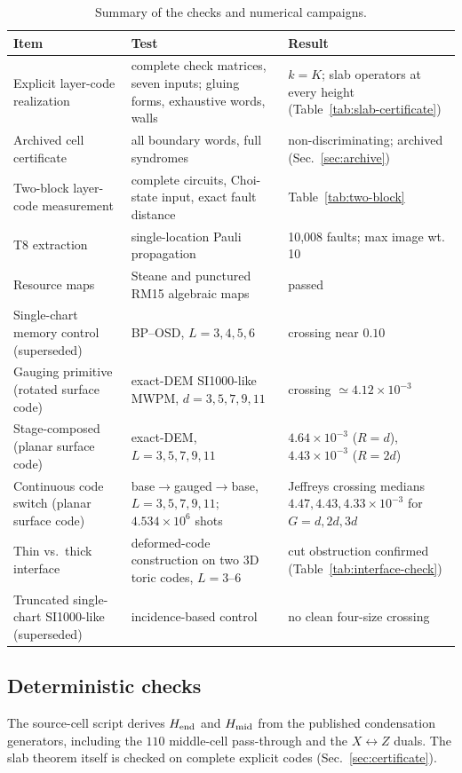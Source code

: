 \documentclass[aps,prx,reprint,superscriptaddress,nofootinbib,floatfix,longbibliography]{revtex4-2}
\theoremstyle{definition}
\begin{document}
\begin{table}[t]
\caption{Summary of the checks and numerical campaigns.}
\label{tab:supp-final-campaign}
\begin{tabular}{p{}p{}p{}}
\toprule
Item & Test & Result\\ \midrule
Explicit layer-code realization & complete check matrices, seven inputs; gluing forms, exhaustive words, walls & $k=K$; slab operators at every height (Table~\ref{tab:slab-certificate})\\
Archived cell certificate & all boundary words, full syndromes & non-discriminating; archived (Sec.~\ref{sec:archive})\\
Two-block layer-code measurement & complete circuits, Choi-state input, exact fault distance & Table~\ref{tab:two-block}\\
T8 extraction & single-location Pauli propagation & 10,008 faults; max image wt. 10\\
Resource maps & Steane and punctured RM15 algebraic maps & passed\\
Single-chart memory control (superseded) & BP--OSD, $L=3,4,5,6$ & crossing near $0.10$\\
Gauging primitive (rotated surface code) & exact-DEM SI1000-like MWPM, $d=3,5,7,9,11$ & crossing $\simeq4.12\times10^{-3}$\\
Stage-composed (planar surface code) & exact-DEM, $L=3,5,7,9,11$ & $4.64\times10^{-3}$ ($R=d$), $4.43\times10^{-3}$ ($R=2d$)\\
Continuous code switch (planar surface code) & base$\to$gauged$\to$base, $L=3,5,7,9,11$; $4.534\times10^6$ shots & Jeffreys crossing medians $4.47,4.43,4.33\times10^{-3}$ for $G=d,2d,3d$\\
Thin vs.\ thick interface & deformed-code construction on two 3D toric codes, $L=3$--$6$ & cut obstruction confirmed (Table~\ref{tab:interface-check})\\
Truncated single-chart SI1000-like (superseded) & incidence-based control & no clean four-size crossing\\
\bottomrule
\end{tabular}
\end{table}

\subsection{Deterministic checks}
The source-cell script derives $H_{\rm end}$ and $H_{\rm mid}$ from the published condensation generators, including the $110$ middle-cell pass-through and the $X\leftrightarrow Z$ duals.  The slab theorem itself is checked on complete explicit codes (Sec.~\ref{sec:certificate}).
\end{document}
